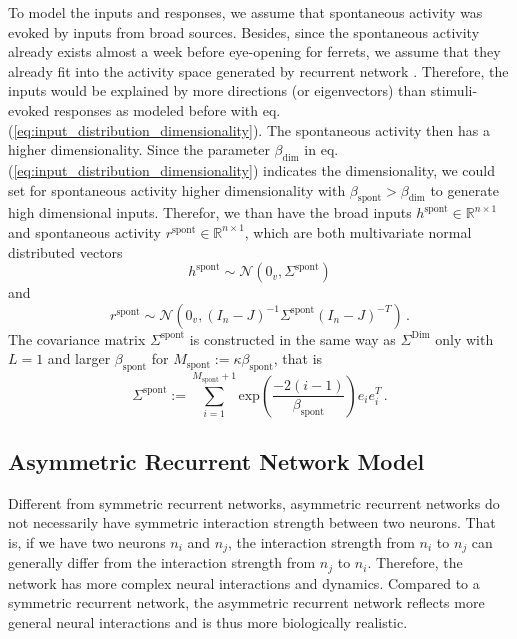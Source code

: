 \documentclass[11pt]{article}
\begin{document}
{	To model the inputs and responses, we assume that spontaneous activity was evoked by inputs from broad sources. Besides, since the spontaneous activity already exists almost a week before eye-opening for ferrets, we assume that they already fit into the activity space generated by recurrent network \cite{tragenap2023nature}. Therefore, the inputs would be explained by more directions (or eigenvectors) than stimuli-evoked responses as modeled before with eq.(\ref{eq:input_distribution_dimensionality}). The spontaneous activity then has a higher dimensionality. Since the parameter $\beta_{\text{dim}}$ in eq.(\ref{eq:input_distribution_dimensionality}) indicates the dimensionality, we could set for spontaneous activity higher dimensionality with $\beta_{\text{spont}} > \beta_{\text{dim}}$ to generate high dimensional inputs. 
	Therefor, we than have the broad inputs $h^{\text{spont}} \in \mathbb{R}^{n \times 1}$ and spontaneous activity $r^{\text{spont}} \in \mathbb{R}^{n \times 1}$, which are both multivariate normal distributed vectors 
		\begin{equation}
			h^{\text{spont}} \sim \mathcal{N}(0_v, \Sigma^{\text{spont}})
		\end{equation}
	and 
		\begin{equation}
			r^{\text{spont}} \sim \mathcal{N}\left( 0_v, (I_n - J)^{-1} \Sigma^{\text{spont}}(I_n - J)^{-T}\right) \, .
		\end{equation}
	The covariance matrix $\Sigma^{\text{spont}}$ is constructed in the same way as $\Sigma^{\text{Dim}}$ only with $L=1$ and larger $\beta_{\text{spont}}$ for $M_{\text{spont}} := \kappa \beta_{\text{spont}}$, that is
		\begin{equation} \label{eq:Sigma_spont}
			\Sigma^{\text{spont}} := \sum_{i=1}^{M_{\text{spont}}+1} \text{exp}\left(\frac{-2(i-1)}{\beta_{\text{spont}}}\right) e_i e_i^T \, .
		\end{equation}
	
	\clearpage
	\subsection{Asymmetric Recurrent Network Model}
	Different from symmetric recurrent networks, asymmetric recurrent networks do not necessarily have symmetric interaction strength between two neurons. That is, if we have two neurons $n_i$ and $n_j$, the interaction strength from $n_i$ to $n_j$ can generally differ from the interaction strength from $n_j$ to $n_i$. Therefore, the network has more complex neural interactions and dynamics. Compared to a symmetric recurrent network, the asymmetric recurrent network reflects more general neural interactions and is thus more biologically realistic. 
	
}
\end{document}
